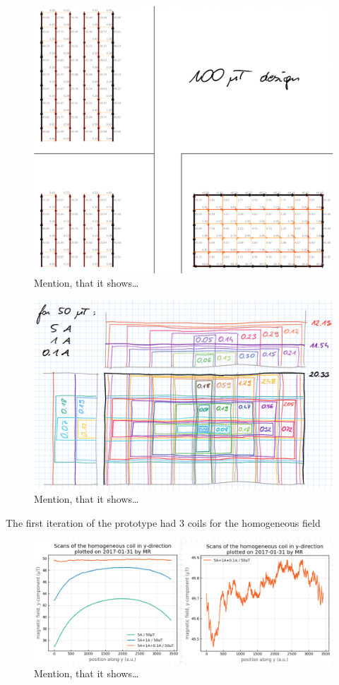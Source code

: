 \begin{figure}
  \centering
  \includegraphics[width=0.9\linewidth]{gfx/prototype/coil_x_z_currents.png}
  \caption{Mention, that it shows\ldots}
  \label{fig:prototype_coil_x_z_currents}
\end{figure}

\begin{figure}
  \centering
  \includegraphics[width=0.9\linewidth]{gfx/prototype/coil_x_z_decomposition.png}
  \caption{Mention, that it shows\ldots}
  \label{fig:prototype_coil_x_z_decomposition}
\end{figure}

The first iteration of the prototype had 3 coils for the homogeneous field

\begin{figure}
  \centering
  \includegraphics[width=0.9\linewidth]{gfx/prototype/linear_map.png}
  \caption{Mention, that it shows\ldots}
  \label{fig:prototype_linear_map}
\end{figure}

